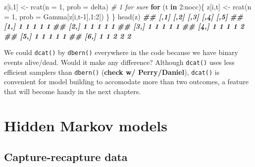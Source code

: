 \documentclass[
  12pt,
]{krantz}
\newenvironment{Shaded}{\begin{snugshade}}{\end{snugshade}}
\newcommand{\AttributeTok}[1]{\textcolor[rgb]{0.77,0.63,0.00}{#1}}
\newcommand{\CommentTok}[1]{\textcolor[rgb]{0.56,0.35,0.01}{\textit{#1}}}
\newcommand{\ControlFlowTok}[1]{\textcolor[rgb]{0.13,0.29,0.53}{\textbf{#1}}}
\newcommand{\DecValTok}[1]{\textcolor[rgb]{0.00,0.00,0.81}{#1}}
\newcommand{\DocumentationTok}[1]{\textcolor[rgb]{0.56,0.35,0.01}{\textbf{\textit{#1}}}}
\newcommand{\FunctionTok}[1]{\textcolor[rgb]{0.00,0.00,0.00}{#1}}
\newcommand{\NormalTok}[1]{#1}
\newcommand{\OtherTok}[1]{\textcolor[rgb]{0.56,0.35,0.01}{#1}}
\newcommand{\SpecialCharTok}[1]{\textcolor[rgb]{0.00,0.00,0.00}{#1}}
\begin{document}
\begin{Shaded}
\begin{Highlighting}[]
\NormalTok{  z[i,}\DecValTok{1}\NormalTok{] }\OtherTok{\textless{}{-}} \FunctionTok{rcat}\NormalTok{(}\AttributeTok{n =} \DecValTok{1}\NormalTok{, }\AttributeTok{prob =}\NormalTok{ delta) }\CommentTok{\# 1 for sure}
  \ControlFlowTok{for}\NormalTok{ (t }\ControlFlowTok{in} \DecValTok{2}\SpecialCharTok{:}\NormalTok{nocc)\{}
\NormalTok{    z[i,t] }\OtherTok{\textless{}{-}} \FunctionTok{rcat}\NormalTok{(}\AttributeTok{n =} \DecValTok{1}\NormalTok{, }\AttributeTok{prob =}\NormalTok{ Gamma[z[i,t}\DecValTok{{-}1}\NormalTok{],}\DecValTok{1}\SpecialCharTok{:}\DecValTok{2}\NormalTok{]) }
\NormalTok{  \}}
\NormalTok{\}}
\FunctionTok{head}\NormalTok{(z) }
\DocumentationTok{\#\#      [,1] [,2] [,3] [,4] [,5]}
\DocumentationTok{\#\# [1,]    1    1    1    1    1}
\DocumentationTok{\#\# [2,]    1    1    1    1    1}
\DocumentationTok{\#\# [3,]    1    1    1    1    1}
\DocumentationTok{\#\# [4,]    1    1    1    1    2}
\DocumentationTok{\#\# [5,]    1    1    1    1    1}
\DocumentationTok{\#\# [6,]    1    1    2    2    2}
\end{Highlighting}
\end{Shaded}

We could \texttt{dcat()} by \texttt{dbern()} everywhere in the code because we have binary events alive/dead. Would it make any difference? Although \texttt{dcat()} uses less efficient samplers than \texttt{dbern()} (\textbf{check w/ Perry/Daniel}), \texttt{dcat()} is convenient for model building to accomodate more than two outcomes, a feature that will become handy in the next chapters.

\hypertarget{hidden-markov-models}{%
\section{Hidden Markov models}\label{hidden-markov-models}}

\hypertarget{capture-recapture-data}{%
\subsection{Capture-recapture data}\label{capture-recapture-data}}
\end{document}
